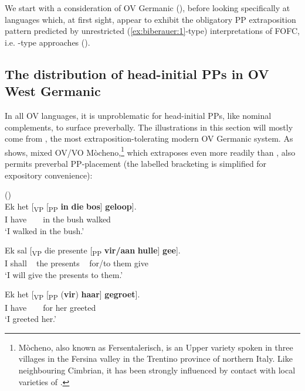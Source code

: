 \documentclass[output=paper]{LSP/langsci}
\begin{document}
We start with a consideration of OV Germanic (), before looking specifically at languages which, at first sight, appear to exhibit the obligatory PP extraposition pattern predicted by unrestricted (\ref{ex:biberauer:1}-type) interpretations of FOFC, i.e. -type approaches (). 

\subsection{The distribution of head-initial PPs in OV West Germanic}\label{sec:biberauer:3.1}

In all OV  languages, it is unproblematic for head-initial PPs, like nominal complements, to surface preverbally. The illustrations in this section will mostly come from , the most extraposition-tolerating modern OV Germanic system. As  shows, mixed OV/VO Mòcheno,\footnote{Mòcheno, also known as Fersentalerisch, is an Upper  variety spoken in three villages in the Fersina valley in the Trentino province of northern Italy. Like neighbouring Cimbrian, it has been strongly influenced by contact with local varieties of .} which extraposes even more readily than , also permits preverbal PP-placement (the labelled bracketing is simplified for expository convenience):

\ea%
    \label{ex:biberauer:14}
     ()\\
	 \ea  \label{ex:biberauer:14a}
\gll Ek het    [\textsubscript{VP} [\textsubscript{PP} \textbf{in}  \textbf{die} \textbf{bos}] \textbf{geloop}].      \\
    I    have           ~           ~                       in  the bush walked\\
\glt   ‘I walked in the bush.’

 \ex  \label{ex:biberauer:14b}
\gll   Ek sal    [\textsubscript{VP} die presente [\textsubscript{PP} \textbf{vir/aan} \textbf{hulle}] \textbf{gee}].\\
    I    shall    ~                      the presents  ~    for/to    them  give\\
\glt   ‘I will give the presents to them.’

 \ex  \label{ex:biberauer:14c}
\gll  Ek het    [\textsubscript{VP} [\textsubscript{PP} (\textbf{vir}) \textbf{haar}] \textbf{gegroet}].\\
     I    have           ~ ~  for   her    greeted\\
\glt    ‘I greeted her.’
\z
\z
\end{document}
